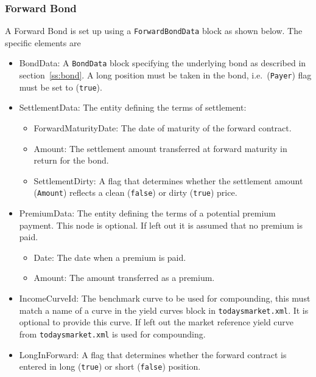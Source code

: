 \subsubsection{Forward Bond}
\label{ss:forwardbond}

A Forward Bond is set up using a {\tt ForwardBondData} block as shown below. The specific elements
are

\begin{itemize}
   \item BondData: A {\tt BondData} block specifying the underlying bond as described in section~\ref{ss:bond}. A long position must be taken in the bond, i.e.~({\tt Payer}) flag must be set to ({\tt true}).
   \item SettlementData: The entity defining the terms of settlement:
   \begin{itemize}
       \item ForwardMaturityDate: The date of maturity of the forward contract.
       \item Amount: The settlement amount transferred at forward maturity in return for the bond.
       \item SettlementDirty: A flag that determines whether  the settlement amount {({\tt Amount})} reflects a clean ({\tt false}) or dirty ({\tt true}) price.
   \end{itemize}
   \item PremiumData: The entity defining the terms of a potential premium payment. This node is optional. If left out it is assumed that no premium is paid.
   \begin{itemize}
       \item Date: The date when a premium is paid.
       \item Amount: The amount transferred as a premium.
   \end{itemize}
   \item IncomeCurveId: The benchmark curve to be used for compounding, this must match a name of a curve in the yield
   curves block in {\tt todaysmarket.xml}. It is optional to provide this curve. If left out the market reference yield curve from {\tt todaysmarket.xml} is used for compounding.
   \item LongInForward: A flag that determines whether the forward contract is entered in long ({\tt true}) or short ({\tt false}) position.
 \end{itemize}

